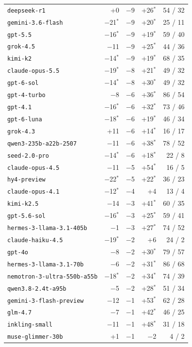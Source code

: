 {\begin{tabular}[t]{lrrrr}
\texttt{deepseek-r1} & +0 & $-$9 & +26$^*$ & 54 / 32 \\
\texttt{gemini-3.6-flash} & $-$21$^*$ & $-$9 & +20$^*$ & 25 / 11 \\
\texttt{gpt-5.5} & $-$16$^*$ & $-$9 & +19$^*$ & 59 / 40 \\
\texttt{grok-4.5} & $-$11 & $-$9 & +25$^*$ & 44 / 36 \\
\texttt{kimi-k2} & $-$14$^*$ & $-$9 & +19$^*$ & 68 / 35 \\
\texttt{claude-opus-5.5} & $-$19$^*$ & $-$8 & +21$^*$ & 49 / 32 \\
\texttt{gpt-6-sol} & $-$14$^*$ & $-$8 & +30$^*$ & 49 / 32 \\
\texttt{gpt-4-turbo} & $-$8 & $-$6 & +36$^*$ & 86 / 54 \\
\texttt{gpt-4.1} & $-$16$^*$ & $-$6 & +32$^*$ & 73 / 46 \\
\texttt{gpt-6-luna} & $-$18$^*$ & $-$6 & +19$^*$ & 46 / 34 \\
\texttt{grok-4.3} & +11 & $-$6 & +14$^*$ & 16 / 17 \\
\texttt{qwen3-235b-a22b-2507} & $-$11 & $-$6 & +38$^*$ & 78 / 52 \\
\texttt{seed-2.0-pro} & $-$14$^*$ & $-$6 & +18$^*$ & 22 / 8 \\
\texttt{claude-opus-4.5} & $-$11 & $-$5 & +54$^*$ & 16 / 5 \\
\texttt{hy4-preview} & $-$22$^*$ & $-$5 & +22$^*$ & 36 / 23 \\
\texttt{claude-opus-4.1} & $-$12$^*$ & $-$4 & +4 & 13 / 4 \\
\texttt{kimi-k2.5} & $-$14 & $-$3 & +41$^*$ & 60 / 35 \\
\texttt{gpt-5.6-sol} & $-$16$^*$ & $-$3 & +25$^*$ & 59 / 41 \\
\texttt{hermes-3-llama-3.1-405b} & $-$1 & $-$3 & +27$^*$ & 74 / 52 \\
\texttt{claude-haiku-4.5} & $-$19$^*$ & $-$2 & +6 & 24 / 2 \\
\texttt{gpt-4o} & $-$8 & $-$2 & +30$^*$ & 79 / 57 \\
\texttt{hermes-3-llama-3.1-70b} & $-$6 & $-$2 & +31$^*$ & 86 / 68 \\
\texttt{nemotron-3-ultra-550b-a55b} & $-$18$^*$ & $-$2 & +34$^*$ & 74 / 39 \\
\texttt{qwen3.8-2.4t-a95b} & $-$5 & $-$2 & +28$^*$ & 51 / 34 \\
\texttt{gemini-3-flash-preview} & $-$12 & $-$1 & +53$^*$ & 62 / 28 \\
\texttt{glm-4.7} & $-$7 & $-$1 & +42$^*$ & 46 / 25 \\
\texttt{inkling-small} & $-$11 & $-$1 & +48$^*$ & 31 / 18 \\
\texttt{muse-glimmer-30b} & +1 & $-$1 & $-$2 & 4 / 2 \\
\bottomrule
\end{tabular}}
